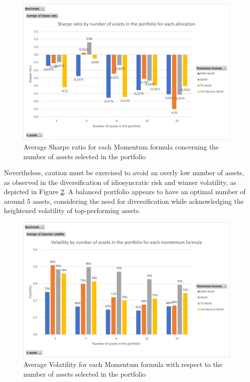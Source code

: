\documentclass{article}
\begin{document}
\begin{figure}[H] %
    \centering
    \includegraphics[width=0.75\linewidth]{absolute_management/all_momentum_formula.png}
    \caption{Average Sharpe ratio for each Momentum formula concerning the number of assets selected in the portfolio}
    \label{fig:SharpeForAllMoM}
\end{figure}

Nevertheless, caution must be exercised to avoid an overly low number of assets, as observed in the diversification of idiosyncratic risk and winner volatility, as depicted in Figure \ref{fig:VolForAllMoM}. A balanced portfolio appears to have an optimal number of around 5 assets, considering the need for diversification while acknowledging the heightened volatility of top-performing assets.


\begin{figure}[H] %
    \centering
    \includegraphics[width=0.75\linewidth]{absolute_management/all_momentum_formula_vol.png}
    \caption{Average Volatility for each Momentum formula with respect to the number of assets selected in the portfolio}
    \label{fig:VolForAllMoM}
\end{figure}
\end{document}
